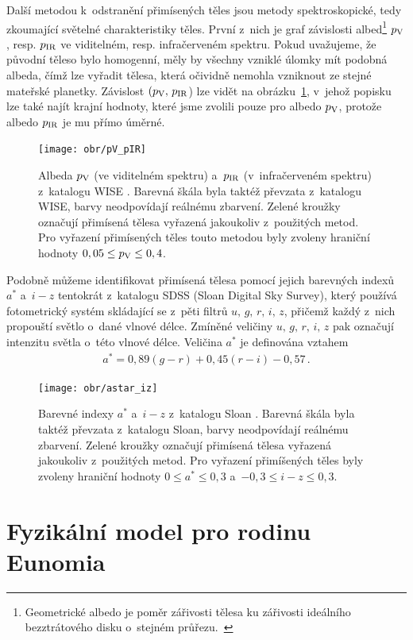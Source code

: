 \documentclass[A4paper, 12pt, oneside]{book}
\begin{document}
Další metodou k~odstranění přimísených těles jsou metody spektroskopické, tedy zkoumající světelné charakteristiky těles. První z~nich je graf závislosti albed\footnote{Geometrické albedo je poměr zářivosti tělesa ku zářivosti ideálního bezztrátového disku o~stejném průřezu.~\cite{fmt}} $p_{\rm V}$, resp. $p_{\rm IR}$ ve viditelném, resp. infračerveném spektru. Pokud uvažujeme, že původní těleso bylo homogenní, měly by všechny vzniklé úlomky mít podobná albeda, čímž lze vyřadit tělesa, která očividně nemohla vzniknout ze stejné mateřské planetky. Závislost $(p_{\rm V},\,p_{\rm IR}$) lze vidět na obrázku~\ref{fig:pV_pIR}, v~jehož popisku lze také najít krajní hodnoty, které jsme zvolili pouze pro albedo $p_{\rm V}$, protože albedo $p_{\rm IR}$ je mu přímo úměrné.

\begin{figure}
	\centering
	\texttt{[image: obr/pV\_pIR]}
	\caption{Albeda $p_{\rm V}$ (ve viditelném spektru) a~$p_{\rm IR}$ (v~infračerveném spektru) z~katalogu WISE \cite{nugent15}. Barevná škála byla taktéž převzata z~katalogu WISE, barvy neodpovídají reálnému zbarvení. Zelené kroužky označují přimísená tělesa vyřazená jakoukoliv z~použitých metod. Pro vyřazení přimísených těles touto metodou byly zvoleny hraniční hodnoty $0,05 \leq p_{\rm V} \leq 0,4$.}
	\label{fig:pV_pIR}
\end{figure}

Podobně můžeme identifikovat přimísená tělesa pomocí jejich barevných indexů $a^*$ a~$i-z$ tentokrát z~katalogu SDSS (Sloan Digital Sky Survey), který používá fotometrický systém skládající se z~pěti filtrů $u,\,g,\,r,\,i,\,z$, přičemž každý z~nich propouští světlo o~dané vlnové délce. Zmíněné veličiny $u,\,g,\,r,\,i,\,z$ pak označují intenzitu světla o~této vlnové délce. Veličina $a^*$ je definována vztahem~\cite{ivezic01}
\begin{align}
	a^ *= 0,89 (g - r) + 0,45 (r - i) - 0,57\,.
\end{align}
\begin{figure}
	\centering
	\texttt{[image: obr/astar\_iz]}
	\caption{Barevné indexy $a^*$ a~$i-z$ z~katalogu Sloan \cite{ivezic01}. Barevná škála byla taktéž převzata z~katalogu Sloan, barvy neodpovídají reálnému zbarvení. Zelené kroužky označují přimísená tělesa vyřazená jakoukoliv z~použitých metod. Pro vyřazení přimíšených těles byly zvoleny hraniční hodnoty $0\leq a^* \leq 0,3$ a~$-0,3\leq i-z \leq 0,3$.}
	\label{fig:astar_iz}
\end{figure}
\pagebreak

\section{Fyzikální model pro rodinu Eunomia}
\end{document}
